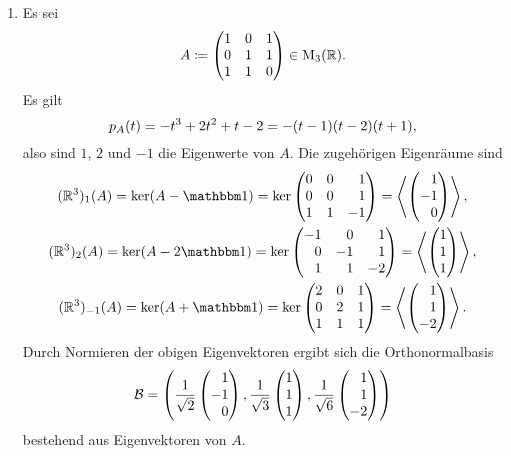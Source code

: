 \begin{example}
  \leavevmode
  \begin{enumerate}
    \item
      Es sei
      \[
                  A
        \coloneqq \begin{pmatrix}
                    1 & 0 & 1 \\
                    0 & 1 & 1 \\
                    1 & 1 & 0
                  \end{pmatrix}
        \in       \operatorname{M}_{3}(\mathbb{R}).
      \]
      Es gilt
      \[
          p_{A}(t)
        = - t^3 + 2 t^2 + t - 2
        = - (t-1)(t-2)(t+1),
      \]
      also sind $1$, $2$ und $-1$ die Eigenwerte von $A$.
      Die zugehörigen Eigenräume sind
      \begin{gather*}
          \eigenspace{(\Real^3)}{A}{1}
        = \ker  (A - \Id)
        = \ker  \begin{pmatrix*}[r]
                  0 & 0 &  1  \\
                  0 & 0 &  1  \\
                  1 & 1 & -1
                \end{pmatrix*}
        = \generated{ \rvect{1 \\ -1 \\ 0} },
      \\
          \eigenspace{(\Real^3)}{A}{2}
        = \ker  (A - 2\Id)
        = \ker  \begin{pmatrix*}[r]
                  -1  &  0  &  1 \\
                   0  & -1  &  1 \\
                   1  &  1  & -2
                \end{pmatrix*}
        = \generated{ \vect{1 \\ 1 \\ 1} },
      \\
          \eigenspace{(\Real^3)}{A}{-1}
        = \ker  (A + \Id)
        = \ker  \begin{pmatrix*}[r]
                  2 & 0 & 1 \\
                  0 & 2 & 1 \\
                  1 & 1 & 1
                \end{pmatrix*}
        = \generated{ \rvect{1 \\ 1 \\ -2} }.
      \end{gather*}
      Durch Normieren der obigen Eigenvektoren ergibt sich die Orthonormalbasis
      \[
          \basis{B}
        = \left(
            \frac{1}{\sqrt{2}} \rvect{1 \\ -1 \\ 0},
            \frac{1}{\sqrt{3}} \vect{1 \\ 1 \\ 1},
            \frac{1}{\sqrt{6}} \rvect{1 \\ 1 \\ -2}
          \right)
      \]
      bestehend aus Eigenvektoren von $A$.
      

\end{enumerate}
\end{example}
